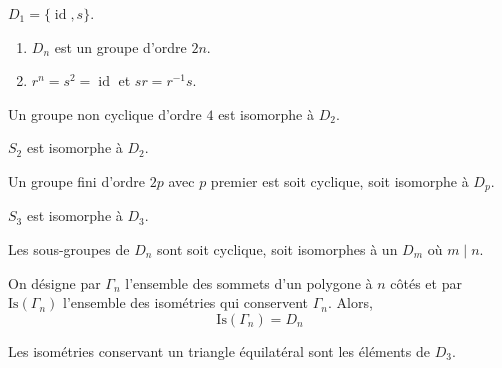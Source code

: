   \begin{example}
    $D_1 = \{ \operatorname{id}, s \}$.
  \end{example}

  \begin{proposition}
    \begin{enumerate}[label=(\roman*)]
      \item $D_n$ est un groupe d'ordre $2n$.
      \item $r^n = s^2 = \operatorname{id}$ et $sr = r^{-1}s$.
    \end{enumerate}
  \end{proposition}


  \begin{proposition}
    Un groupe non cyclique d'ordre $4$ est isomorphe à $D_2$.
  \end{proposition}


  \begin{example}
    $S_2$ est isomorphe à $D_2$.
  \end{example}


  \begin{proposition}
    Un groupe fini d'ordre $2p$ avec $p$ premier est soit cyclique, soit isomorphe à $D_p$.
  \end{proposition}

  \begin{example}
    $S_3$ est isomorphe à $D_3$.
  \end{example}


  \begin{proposition}
    Les sous-groupes de $D_n$ sont soit cyclique, soit isomorphes à un $D_m$ où $m \mid n$.
  \end{proposition}


  \begin{theorem}
    On désigne par $\Gamma_n$ l'ensemble des sommets d'un polygone à $n$ côtés et par $\mathrm{Is}(\Gamma_n)$ l'ensemble des isométries qui conservent $\Gamma_n$. Alors,
    \[ \mathrm{Is}(\Gamma_n) = D_n \]
  \end{theorem}

  \begin{example}
    Les isométries conservant un triangle équilatéral sont les éléments de $D_3$.
  \end{example}

